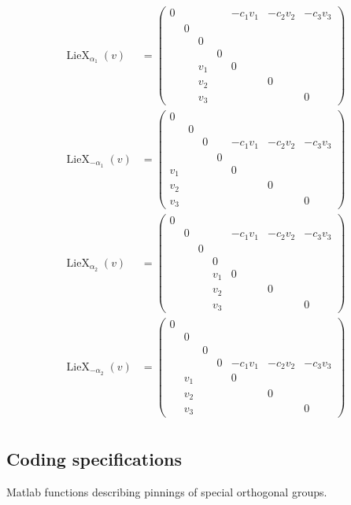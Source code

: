 \documentclass[12pt]{article}
\theoremstyle{definition}
\numberwithin{theorem}{subsection}
\DeclareMathOperator{\LieX}{LieX}
\begin{document}
\begin{align*}
	\LieX_{\alpha_1}(v) &=
	\begin{pmatrix}
		0 &&&& -c_1 v_1 & -c_2 v_2 & -c_3 v_3 \\
		& 0 \\
		&& 0 \\
		&&& 0 \\
		&& v_1 && 0 \\
		&& v_2 &&& 0 \\
		&& v_3 &&&& 0
	\end{pmatrix} \\
	\LieX_{-\alpha_1}(v) &=
	\begin{pmatrix}
		0 \\
		& 0 \\
		&& 0 && -c_1 v_1 & -c_2 v_2 & -c_3 v_3 \\
		&&& 0 \\
		v_1 && && 0 \\
		v_2 &&  &&& 0 \\
		v_3 && &&&& 0
	\end{pmatrix} \\
	\LieX_{\alpha_2}(v) &=
	\begin{pmatrix}
		0 \\
		& 0 & && -c_1 v_1 & -c_2 v_2 & -c_3 v_3\\
		&& 0  \\
		&&& 0 \\
		&&& v_1& 0 \\
		&&  & v_2 && 0 \\
		&& & v_3 &&& 0
	\end{pmatrix} \\
	\LieX_{-\alpha_2}(v) &=
	\begin{pmatrix}
		0 \\
		& 0 \\
		&& 0  \\
		&&& 0 & -c_1 v_1 & -c_2 v_2 & -c_3 v_3 \\
		& v_1 &&& 0 \\
		& v_2 &&&& 0 \\
		& v_3 &&&&& 0
	\end{pmatrix} \\
\end{align*}

\subsection{Coding specifications}

Matlab functions describing pinnings of special orthogonal groups. 
\end{document}
